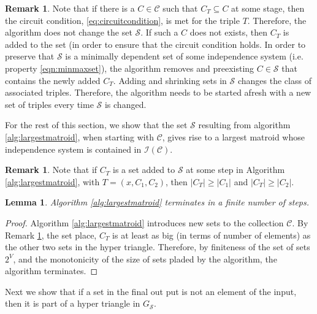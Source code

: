 \documentclass[11pt]{article}
\newcommand{\sI}{\mathscr{I}}
\newcommand{\sC}{\mathscr{C}}
\newcommand{\sS}{\mathscr{S}}
\newtheorem{lem}[thm]{Lemma}
\theoremstyle{remark}
\theoremstyle{definition}
\newtheorem{rmk}[thm]{Remark}
\begin{document}
\begin{rmk} \label{rmk:algoexplained}Note that if there is a $C \in \sC$ such that $C_T \subseteq C$ at some stage, then the circuit condition, \eqref{eq:circuitcondition}, is met for the triple $T$. Therefore, the algorithm does not change the set $\sS$. If such a $C$ does not exists, then $C_T$ is added to the set (in order to ensure that the circuit condition holds. In order to preserve that $\sS$ is a minimally dependent set of some independence system (i.e. property \eqref{eqn:minmaxset}), the algorithm removes and preexisting $C \in \sS$ that contains the newly added $C_T$. Adding and shrinking sets in $\sS$ changes the class of associated triples. Therefore, the algorithm needs to be started afresh with a new set of triples every time $\sS$ is changed. \end{rmk}

For the rest of this section, we show that the set $\sS$ resulting from algorithm \ref{alg:largestmatroid}, when starting with $\sC$, gives rise to a largest matroid whose independence system is contained in $\sI(\sC)$. 

\begin{rmk}\label{rmk:placementmonotonic}
    Note that if $C_T$ is a set added to $\sS$ at some step in Algorithm \ref{alg:largestmatroid}, with $T = (x, C_1, C_2)$, then $|C_T| \geq |C_1|$ and $|C_T| \geq |C_2|$.
\end{rmk}

\begin{lem} \label{res:algoterminates}
    Algorithm \ref{alg:largestmatroid} terminates in a finite number of steps. 
\end{lem}
\begin{proof}
    Algorithm \ref{alg:largestmatroid} introduces new sets to the collection $\sC$. By Remark \ref{rmk:placementmonotonic}, the set place, $C_T$ is at least as big (in terms of number of elements) as the other two sets in the hyper triangle. Therefore, by finiteness of the set of sets $2^V$, and the monotonicity of the size of sets pladed by the algorithm, the algorithm terminates.
\end{proof}

Next we show that if a set in the final out put is not an element of the input, then it is part of a hyper triangle in $G_\sS$.
\end{document}
